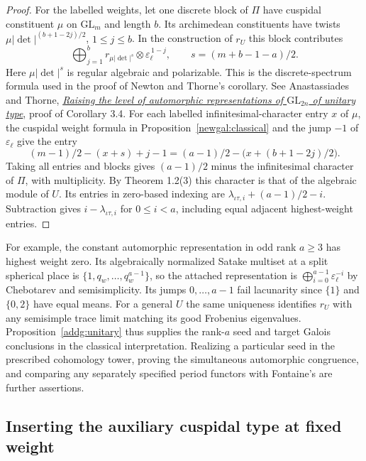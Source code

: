 \begin{proof}
For the labelled weights, let one discrete block of \(\Pi\) have
cuspidal constituent \(\mu\) on \(\mathrm{GL}_m\) and length \(b\).
Its archimedean constituents have twists \(\mu|\det|^{(b+1-2j)/2}\),
\(1\le j\le b\). In the construction of \(r_U\) this block contributes
\[
   \bigoplus_{j=1}^{b}
   r_{\mu|\det|^s}\otimes\varepsilon_\ell^{\,1-j},
   \qquad s=(m+b-1-a)/2.
\]
Here \(\mu|\det|^s\) is regular algebraic and polarizable. This is the
discrete-spectrum formula used in the proof of Newton and Thorne's
corollary. See Anastassiades and Thorne,
\href{https://arxiv.org/abs/1912.11267}{\emph{Raising the level of automorphic representations of
\(\mathrm{GL}_{2n}\) of unitary type}}, proof of Corollary 3.4.
For each labelled infinitesimal-character entry \(x\) of \(\mu\),
the cuspidal weight formula in Proposition~\ref{newgal:classical} and
the jump \(-1\) of \(\varepsilon_\ell\) give the entry
\[
  (m-1)/2-(x+s)+j-1
      =(a-1)/2-\bigl(x+(b+1-2j)/2\bigr).
\]
Taking all entries and blocks gives \((a-1)/2\) minus the infinitesimal
character of \(\Pi\), with multiplicity. By Theorem 1.2(3) this character
is that of the algebraic module of \(U\). Its entries in zero-based
indexing are \(\lambda_{\iota\tau,i}+(a-1)/2-i\). Subtraction gives
\(i-\lambda_{\iota\tau,i}\) for \(0\le i<a\), including equal adjacent
highest-weight entries.
\end{proof}

For example, the constant automorphic representation in odd rank
\(a\ge3\) has highest weight zero. Its algebraically normalized Satake multiset at a
split spherical place is \(\{1,q_w,\ldots,q_w^{a-1}\}\), so the attached
representation is \(\bigoplus_{i=0}^{a-1}\varepsilon_\ell^{-i}\) by
Chebotarev and semisimplicity. Its jumps \(0,\ldots,a-1\) fail
lacunarity since \(\{1\}\) and \(\{0,2\}\) have equal means.
For a general \(U\) the same uniqueness identifies \(r_U\) with any
semisimple trace limit matching its good Frobenius eigenvalues.
Proposition~\ref{addg:unitary} thus supplies the rank-\(a\) seed
and target Galois conclusions in the classical interpretation.
Realizing a particular seed in the prescribed cohomology tower,
proving the simultaneous automorphic congruence, and comparing any
separately specified period functors with Fontaine's are further assertions.

\subsection{Inserting the auxiliary cuspidal type at fixed weight}


